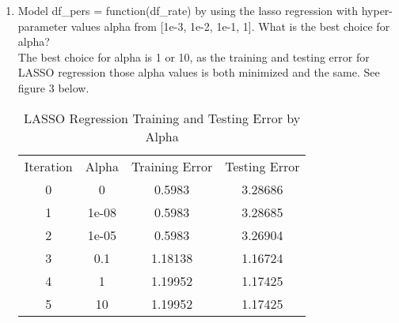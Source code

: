 \documentclass[12pt,twoside]{article}
\begin{document}
\begin{enumerate}
    
    \item Model df\_pers = function(df\_rate) by using the lasso regression with hyper-parameter values alpha from [1e-3, 1e-2, 1e-1, 1]. What is the best choice for alpha?\\
    The best choice for alpha is 1 or 10, as the training and testing error for LASSO regression those alpha values is both minimized and the same. See figure 3 below. \\
    \begin{table}[h!]
        \centering
        \begin{tabular}{c|c|c|c}
                Iteration &  Alpha &  Training Error & Testing Error\\
                0 & 0 & 0.5983 & 3.28686 \\
                1 & 1e-08 & 0.5983 & 3.28685 \\ 
                2 & 1e-05 &  0.5983 & 3.26904 \\
                3 & 0.1 & 1.18138 & 1.16724 \\
                4 & 1 &  1.19952 & 1.17425 \\
                5 & 10 & 1.19952 & 1.17425 \\
        \end{tabular}
        \caption{LASSO Regression Training and Testing Error by Alpha}
        \label{tab:my_label}
    \end{table} 
\end{enumerate}
\end{document}

